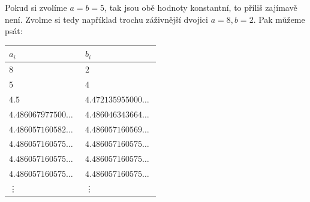 \documentclass[12pt]{report}
\begin{document}
\begin{priklad}\label{pr1}
Pokud si zvolíme $a=b=5$, tak jsou obě hodnoty konstantní, to příliš zajímavě není. Zvolme si tedy například trochu záživnější dvojici $a = 8, b = 2$. Pak můžeme psát:


\begin{longtable}[H]{>{\raggedright\arraybackslash}p{0.3\linewidth}p{0.202\linewidth}}
\toprule
$a_i$ & $b_i$\\
\midrule
$8$ & \noindent $2$\\
$5$ & \noindent $4$\\
$ 4.5$ & $4.472135955000\dots$\\
$4.486067977500\dots$ & $4.486046343664\dots$\\
$4.486057160582\dots$ & $4.486057160569\dots$\\ 
$4.486057160575\dots$ & $4.486057160575\dots$\\
$4.486057160575\dots$ & $4.486057160575\dots$\\
$4.486057160575\dots$ & $4.486057160575\dots$\\
\vdots & \vdots\\
\bottomrule 
\end{longtable}





\end{priklad}
\end{document}
